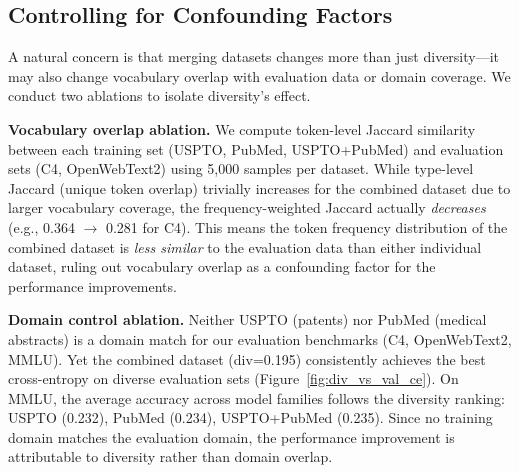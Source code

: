 \subsection{Controlling for Confounding Factors} \label{sec:confounding}
A natural concern is that merging datasets changes more than just diversity---it may also change vocabulary overlap with evaluation data or domain coverage.
We conduct two ablations to isolate diversity's effect.

\textbf{Vocabulary overlap ablation.}
We compute token-level Jaccard similarity between each training set (USPTO, PubMed, USPTO+PubMed) and evaluation sets (C4, OpenWebText2) using 5,000 samples per dataset.
While type-level Jaccard (unique token overlap) trivially increases for the combined dataset due to larger vocabulary coverage, the frequency-weighted Jaccard actually \emph{decreases} (e.g., 0.364 $\to$ 0.281 for C4).
This means the token frequency distribution of the combined dataset is \emph{less similar} to the evaluation data than either individual dataset, ruling out vocabulary overlap as a confounding factor for the performance improvements.

\textbf{Domain control ablation.}
Neither USPTO (patents) nor PubMed (medical abstracts) is a domain match for our evaluation benchmarks (C4, OpenWebText2, MMLU).
Yet the combined dataset (div=0.195) consistently achieves the best cross-entropy on diverse evaluation sets (Figure~\ref{fig:div_vs_val_ce}).
On MMLU, the average accuracy across model families follows the diversity ranking: USPTO (0.232), PubMed (0.234), USPTO+PubMed (0.235).
Since no training domain matches the evaluation domain, the performance improvement is attributable to diversity rather than domain overlap.


